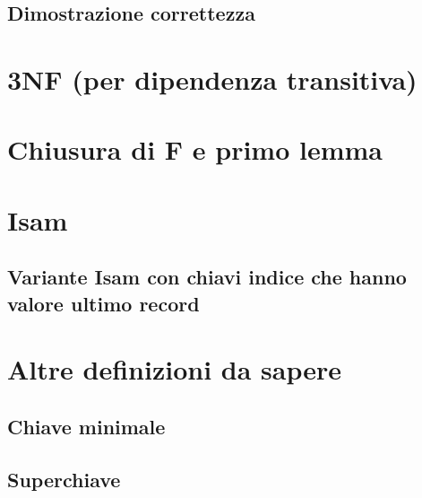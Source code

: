 \documentclass{article}
\begin{document}
\subsection{Dimostrazione correttezza}
\pagebreak
\section{3NF (per dipendenza transitiva)}
\pagebreak
\section{Chiusura di F e primo lemma}
\pagebreak
\section{Isam}
\subsection{Variante Isam con chiavi indice che hanno valore ultimo record}
\pagebreak
\section{Altre definizioni da sapere}
\subsection{Chiave minimale} 
\subsection{Superchiave}
\end{document}
